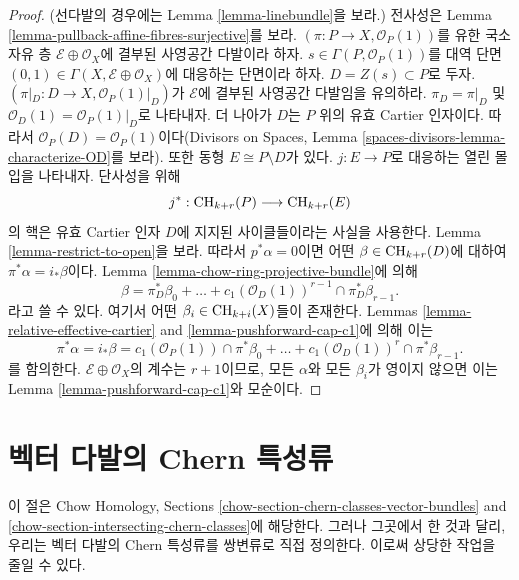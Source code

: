 \begin{proof}
(선다발의 경우에는 Lemma \ref{lemma-linebundle}을 보라.)
전사성은 Lemma \ref{lemma-pullback-affine-fibres-surjective}를 보라.
$(\pi  : P \to X, \mathcal{O}_P(1))$를 유한 국소 자유 층
$\mathcal{E} \oplus \mathcal{O}_X$에 결부된 사영공간 다발이라 하자.
$s \in \Gamma(P, \mathcal{O}_P(1))$를 대역 단면
$(0, 1) \in \Gamma(X, \mathcal{E} \oplus \mathcal{O}_X)$에 대응하는
단면이라 하자. $D = Z(s) \subset P$로 두자.
$(\pi|_D : D \to X , \mathcal{O}_P(1)|_D)$가
$\mathcal{E}$에 결부된 사영공간 다발임을 유의하라.
$\pi_D = \pi|_D$ 및
$\mathcal{O}_D(1) = \mathcal{O}_P(1)|_D$로 나타내자.
더 나아가 $D$는 $P$ 위의 유효 Cartier 인자이다. 따라서
$\mathcal{O}_P(D) = \mathcal{O}_P(1)$이다(Divisors on Spaces, Lemma
\ref{spaces-divisors-lemma-characterize-OD}를 보라).
또한 동형 $E \cong P \setminus D$가 있다.
$j : E \to P$로 대응하는 열린 몰입을 나타내자.
단사성을 위해
$$
j^* :
\mathop{\mathrm{CH}}\nolimits_{k + r}(P)
\longrightarrow
\mathop{\mathrm{CH}}\nolimits_{k + r}(E)
$$
의 핵은 유효 Cartier 인자 $D$에 지지된 사이클들이라는 사실을
사용한다. Lemma \ref{lemma-restrict-to-open}을 보라.
따라서 $p^*\alpha = 0$이면 어떤
$\beta \in \mathop{\mathrm{CH}}\nolimits_{k + r}(D)$에 대하여
$\pi^*\alpha = i_*\beta$이다.
Lemma \ref{lemma-chow-ring-projective-bundle}에 의해
$$
\beta = \pi_D^*\beta_0 +
\ldots + c_1(\mathcal{O}_D(1))^{r - 1} \cap \pi_D^* \beta_{r - 1}.
$$
라고 쓸 수 있다. 여기서 어떤
$\beta_i \in \mathop{\mathrm{CH}}\nolimits_{k + i}(X)$들이 존재한다.
Lemmas \ref{lemma-relative-effective-cartier}
and \ref{lemma-pushforward-cap-c1}에 의해 이는
$$
\pi^*\alpha = i_*\beta =
c_1(\mathcal{O}_P(1)) \cap \pi^*\beta_0 +
\ldots +
c_1(\mathcal{O}_D(1))^r \cap \pi^*\beta_{r - 1}.
$$
를 함의한다.
$\mathcal{E} \oplus \mathcal{O}_X$의 계수는 $r + 1$이므로,
모든 $\alpha$와 모든 $\beta_i$가 영이지 않으면 이는 Lemma
\ref{lemma-pushforward-cap-c1}와 모순이다.
\end{proof}

\section{벡터 다발의 Chern 특성류}
\label{section-chern-classes-vector-bundles}

\noindent
이 절은 Chow Homology, Sections
\ref{chow-section-chern-classes-vector-bundles} and
\ref{chow-section-intersecting-chern-classes}에 해당한다.
그러나 그곳에서 한 것과 달리, 우리는 벡터 다발의 Chern 특성류를
쌍변류로 직접 정의한다. 이로써 상당한 작업을 줄일 수 있다.

